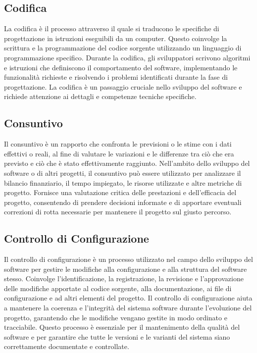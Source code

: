 \subsection{Codifica} 
La codifica è il processo attraverso il quale si traducono le specifiche di progettazione in istruzioni eseguibili da un computer. Questo coinvolge la scrittura e la programmazione del codice sorgente utilizzando un linguaggio di programmazione specifico. Durante la codifica, gli sviluppatori scrivono algoritmi e istruzioni che definiscono il comportamento del software, implementando le funzionalità richieste e risolvendo i problemi identificati durante la fase di progettazione. La codifica è un passaggio cruciale nello sviluppo del software e richiede attenzione ai dettagli e competenze tecniche specifiche.
\subsection{Consuntivo} 
Il consuntivo è un rapporto che confronta le previsioni o le stime con i dati effettivi o reali, al fine di valutare le variazioni e le differenze tra ciò che era previsto e ciò che è stato effettivamente raggiunto. Nell'ambito dello sviluppo del software o di altri progetti, il consuntivo può essere utilizzato per analizzare il bilancio finanziario, il tempo impiegato, le risorse utilizzate e altre metriche di progetto. Fornisce una valutazione critica delle prestazioni e dell'efficacia del progetto, consentendo di prendere decisioni informate e di apportare eventuali correzioni di rotta necessarie per mantenere il progetto sul giusto percorso.
\subsection{Controllo di Configurazione} 
Il controllo di configurazione è un processo utilizzato nel campo dello sviluppo del software per gestire le modifiche alla configurazione e alla struttura del software stesso. Coinvolge l'identificazione, la registrazione, la revisione e l'approvazione delle modifiche apportate al codice sorgente, alla documentazione, ai file di configurazione e ad altri elementi del progetto. Il controllo di configurazione aiuta a mantenere la coerenza e l'integrità del sistema software durante l'evoluzione del progetto, garantendo che le modifiche vengano gestite in modo ordinato e tracciabile. Questo processo è essenziale per il mantenimento della qualità del software e per garantire che tutte le versioni e le varianti del sistema siano correttamente documentate e controllate.
